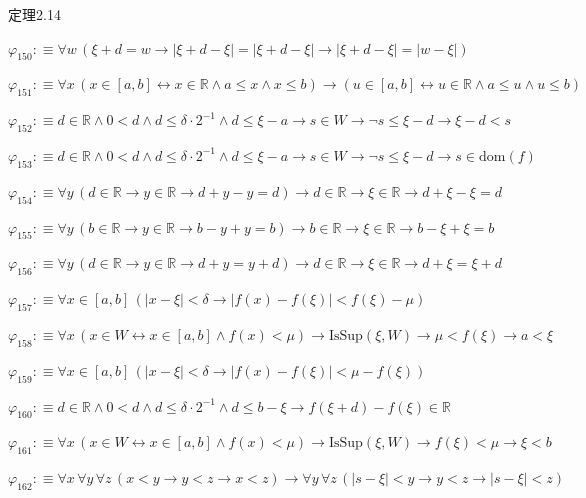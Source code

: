 \begin{fullproof}{定理2.14}
\begin{abbrevlist}
\item $\varphi_{150} :\equiv \forall w\,(\xi + d = w \to \lvert \xi + d - \xi \rvert = \lvert \xi + d - \xi \rvert \to \lvert \xi + d - \xi \rvert = \lvert w - \xi \rvert)$
\item $\varphi_{151} :\equiv \forall x\,(x \in [a,b] \leftrightarrow x \in \mathbb{R} \land a \leq x \land x \leq b) \to (u \in [a,b] \leftrightarrow u \in \mathbb{R} \land a \leq u \land u \leq b)$
\item $\varphi_{152} :\equiv d \in \mathbb{R} \land 0 < d \land d \leq \delta \cdot 2^{-1} \land d \leq \xi - a \to s \in W \to \neg s \leq \xi - d \to \xi - d < s$
\item $\varphi_{153} :\equiv d \in \mathbb{R} \land 0 < d \land d \leq \delta \cdot 2^{-1} \land d \leq \xi - a \to s \in W \to \neg s \leq \xi - d \to s \in \mathrm{dom}(f)$
\item $\varphi_{154} :\equiv \forall y\,(d \in \mathbb{R} \to y \in \mathbb{R} \to d + y - y = d) \to d \in \mathbb{R} \to \xi \in \mathbb{R} \to d + \xi - \xi = d$
\item $\varphi_{155} :\equiv \forall y\,(b \in \mathbb{R} \to y \in \mathbb{R} \to b - y + y = b) \to b \in \mathbb{R} \to \xi \in \mathbb{R} \to b - \xi + \xi = b$
\item $\varphi_{156} :\equiv \forall y\,(d \in \mathbb{R} \to y \in \mathbb{R} \to d + y = y + d) \to d \in \mathbb{R} \to \xi \in \mathbb{R} \to d + \xi = \xi + d$
\item $\varphi_{157} :\equiv \forall x \in [a,b]\,(\lvert x - \xi \rvert < \delta \to \lvert f(x) - f(\xi) \rvert < f(\xi) - \mu)$
\item $\varphi_{158} :\equiv \forall x\,(x \in W \leftrightarrow x \in [a,b] \land f(x) < \mu) \to \mathrm{IsSup}(\xi,W) \to \mu < f(\xi) \to a < \xi$
\item $\varphi_{159} :\equiv \forall x \in [a,b]\,(\lvert x - \xi \rvert < \delta \to \lvert f(x) - f(\xi) \rvert < \mu - f(\xi))$
\item $\varphi_{160} :\equiv d \in \mathbb{R} \land 0 < d \land d \leq \delta \cdot 2^{-1} \land d \leq b - \xi \to f(\xi + d) - f(\xi) \in \mathbb{R}$
\item $\varphi_{161} :\equiv \forall x\,(x \in W \leftrightarrow x \in [a,b] \land f(x) < \mu) \to \mathrm{IsSup}(\xi,W) \to f(\xi) < \mu \to \xi < b$
\item $\varphi_{162} :\equiv \forall x\,\forall y\,\forall z\,(x < y \to y < z \to x < z) \to \forall y\,\forall z\,(\lvert s - \xi \rvert < y \to y < z \to \lvert s - \xi \rvert < z)$

\end{abbrevlist}
\end{fullproof}
